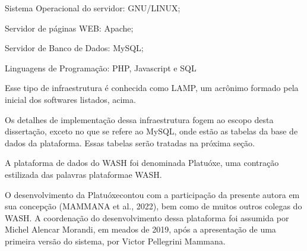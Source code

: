 \documentclass[
12pt,		%
openright,	%
twoside,  %
a4paper,			%
chapter=TITLE,		%
english,			%
french,				%
spanish,			%
brazil				%
]{USPSC-classe/USPSC}
\begin{document}
\begin{alineas}
\item Sistema Operacional do servidor: GNU/LINUX;
\item Servidor de p\'aginas WEB: Apache;
\item Servidor de Banco de Dados: MySQL;
\item Linguagens de Programa\c{c}\~ao: PHP, Javascript e SQL
\end{alineas}

Esse tipo de infraestrutura \'e conhecida como LAMP, um acr\^onimo formado pela inicial dos softwares listados, acima.

















Os detalhes de implementa\c{c}\~ao dessa infraestrutura fogem ao escopo desta disserta\c{c}\~ao, exceto no que se refere ao MySQL, onde est\~ao as tabelas da base de dados da plataforma. Essas tabelas ser\~ao tratadas na pr\'oxima se\c{c}\~ao.

















A plataforma de dados do WASH foi denominada \textquotedbl Platu\'oxe\textquotedbl , uma contra\c{c}\~ao estilizada das palavras \textquotedbl plataforma\textquotedbl  e \textquotedbl WASH\textquotedbl .

















O desenvolvimento da \textquotedbl Platu\'oxe\textquotedbl  contou com a participa\c{c}\~ao da presente autora em sua concep\c{c}\~ao  (MAMMANA et al., 2022), bem como de muitos outros colegas do WASH. A coordena\c{c}\~ao do desenvolvimento dessa plataforma foi assumida por Michel Alencar Morandi, em meados de 2019, ap\'os a apresenta\c{c}\~ao de uma primeira vers\~ao do sistema, por Victor Pellegrini Mammana.
\end{document}

